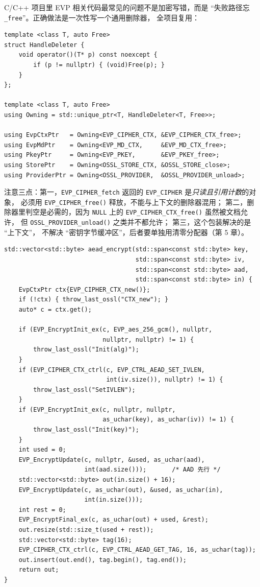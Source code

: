 \documentclass[12pt,a4paper,fontset=fandol]{ctexbook}
\newcommand{\Fn}[1]{\texttt{#1()}}
\newcommand{\Tp}[1]{\texttt{#1}}
\newcommand{\CppJava}{C/C++}
\begin{document}
\CppJava{} 项目里 EVP 相关代码最常见的问题不是加密写错，而是
``失败路径忘 \texttt{\_free}''。正确做法是一次性写一个通用删除器，
全项目复用：

\begin{lstlisting}[caption={通用句柄删除器与 EVP 上下文别名}]
template <class T, auto Free>
struct HandleDeleter {
    void operator()(T* p) const noexcept {
        if (p != nullptr) { (void)Free(p); }
    }
};

template <class T, auto Free>
using Owning = std::unique_ptr<T, HandleDeleter<T, Free>>;

using EvpCtxPtr   = Owning<EVP_CIPHER_CTX, &EVP_CIPHER_CTX_free>;
using EvpMdPtr    = Owning<EVP_MD_CTX,     &EVP_MD_CTX_free>;
using PkeyPtr     = Owning<EVP_PKEY,       &EVP_PKEY_free>;
using StorePtr    = Owning<OSSL_STORE_CTX, &OSSL_STORE_close>;
using ProviderPtr = Owning<OSSL_PROVIDER,  &OSSL_PROVIDER_unload>;
\end{lstlisting}

注意三点：第一，\Tp{EVP\_CIPHER\_fetch} 返回的
\Tp{EVP\_CIPHER} 是\emph{只读且引用计数}的对象，
必须用 \Fn{EVP\_CIPHER\_free} 释放，不能与上下文的删除器混用；
第二，删除器里判空是必需的，因为 \Tp{NULL} 上的
\Fn{EVP\_CIPHER\_CTX\_free} 虽然被文档允许，
但 \Fn{OSSL\_PROVIDER\_unload} 之类并不都允许；
第三，这个包装解决的是 ``上下文''，
不解决 ``密钥字节缓冲区''，后者要单独用清零分配器（第 5 章）。

\begin{lstlisting}[caption={用 RAII 重写 AEAD 加密：异常安全版}]
std::vector<std::byte> aead_encrypt(std::span<const std::byte> key,
                                    std::span<const std::byte> iv,
                                    std::span<const std::byte> aad,
                                    std::span<const std::byte> in) {
    EvpCtxPtr ctx{EVP_CIPHER_CTX_new()};
    if (!ctx) { throw_last_ossl("CTX_new"); }
    auto* c = ctx.get();

    if (EVP_EncryptInit_ex(c, EVP_aes_256_gcm(), nullptr,
                           nullptr, nullptr) != 1) {
        throw_last_ossl("Init(alg)");
    }
    if (EVP_CIPHER_CTX_ctrl(c, EVP_CTRL_AEAD_SET_IVLEN,
                            int(iv.size()), nullptr) != 1) {
        throw_last_ossl("SetIVLEN");
    }
    if (EVP_EncryptInit_ex(c, nullptr, nullptr,
                           as_uchar(key), as_uchar(iv)) != 1) {
        throw_last_ossl("Init(key)");
    }
    int used = 0;
    EVP_EncryptUpdate(c, nullptr, &used, as_uchar(aad),
                      int(aad.size()));       /* AAD 先行 */
    std::vector<std::byte> out(in.size() + 16);
    EVP_EncryptUpdate(c, as_uchar(out), &used, as_uchar(in),
                      int(in.size()));
    int rest = 0;
    EVP_EncryptFinal_ex(c, as_uchar(out) + used, &rest);
    out.resize(std::size_t(used + rest));
    std::vector<std::byte> tag(16);
    EVP_CIPHER_CTX_ctrl(c, EVP_CTRL_AEAD_GET_TAG, 16, as_uchar(tag));
    out.insert(out.end(), tag.begin(), tag.end());
    return out;
}
\end{lstlisting}
\end{document}
